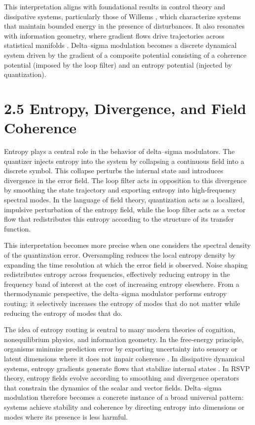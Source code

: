 This interpretation aligns with foundational results in control theory and dissipative systems, particularly those of Willems \citep{willems1972dissipative}, which characterize systems that maintain bounded energy in the presence of disturbances. It also resonates with information geometry, where gradient flows drive trajectories across statistical manifolds \citep{amari2016information}. Delta--sigma modulation becomes a discrete dynamical system driven by the gradient of a composite potential consisting of a coherence potential (imposed by the loop filter) and an entropy potential (injected by quantization).

\section*{2.5 Entropy, Divergence, and Field Coherence}

Entropy plays a central role in the behavior of delta--sigma modulators. The quantizer injects entropy into the system by collapsing a continuous field into a discrete symbol. This collapse perturbs the internal state and introduces divergence in the error field. The loop filter acts in opposition to this divergence by smoothing the state trajectory and exporting entropy into high-frequency spectral modes. In the language of field theory, quantization acts as a localized, impulsive perturbation of the entropy field, while the loop filter acts as a vector flow that redistributes this entropy according to the structure of its transfer function.

This interpretation becomes more precise when one considers the spectral density of the quantization error. Oversampling reduces the local entropy density by expanding the time resolution at which the error field is observed. Noise shaping redistributes entropy across frequencies, effectively reducing entropy in the frequency band of interest at the cost of increasing entropy elsewhere. From a thermodynamic perspective, the delta--sigma modulator performs entropy routing: it selectively increases the entropy of modes that do not matter while reducing the entropy of modes that do.

The idea of entropy routing is central to many modern theories of cognition, nonequilibrium physics, and information geometry. In the free-energy principle, organisms minimize prediction error by exporting uncertainty into sensory or latent dimensions where it does not impair coherence \citep{friston2019free}. In dissipative dynamical systems, entropy gradients generate flows that stabilize internal states \citep{willems1972dissipative}. In RSVP theory, entropy fields evolve according to smoothing and divergence operators that constrain the dynamics of the scalar and vector fields. Delta--sigma modulation therefore becomes a concrete instance of a broad universal pattern: systems achieve stability and coherence by directing entropy into dimensions or modes where its presence is less harmful.

